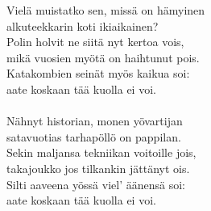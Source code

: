
            Vielä muistatko sen, missä on hämyinen \\
            alkuteekkarin koti ikiaikainen? \\
            Polin holvit ne siitä nyt kertoa vois, \\
            mikä vuosien myötä on haihtunut pois. \\
            Katakombien seinät myös kaikua soi: \\
            aate koskaan tää kuolla ei voi. \\
\hspace{10mm} \\
            Nähnyt historian, monen yövartijan \\
            satavuotias tarhapöllö on pappilan. \\
            Sekin maljansa tekniikan voitoille jois, \\
            takajoukko jos tilkankin jättänyt ois. \\
            Silti aaveena yössä viel' äänensä soi: \\
            aate koskaan tää kuolla ei voi. \\
